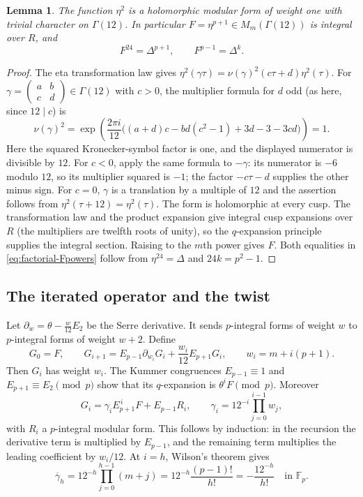 \documentclass[11pt,a4paper]{article}
\numberwithin{equation}{section}
\newtheorem{lemma}[theorem]{Lemma}
\theoremstyle{definition}
\theoremstyle{remark}
\newcommand{\Fp}{\mathbb F_p}
\begin{document}
\begin{lemma}\label{lem:eta-level12}
The function $\eta^2$ is a holomorphic modular form of weight one with
trivial character on $\Gamma(12)$. In particular
$F=\eta^{p+1}\in M_m(\Gamma(12))$ is integral over $R$, and
\begin{equation}\label{eq:factorial-Fpowers}
F^{24}=\Delta^{p+1},\qquad F^{p-1}=\Delta^k.
\end{equation}
\end{lemma}
\begin{proof}
The eta transformation law \citep[Ch.~4]{Knopp70} gives
$\eta^2(\gamma\tau)=\nu(\gamma)^2(c\tau+d)\eta^2(\tau)$.
For $\gamma=\begin{pmatrix}a&b\\c&d\end{pmatrix}\in\Gamma(12)$ with
$c>0$, the multiplier formula for $d$ odd (as here, since $12\mid c$) is
\[
\nu(\gamma)^2=
\exp\!\left(\frac{2\pi i}{12}
\bigl((a+d)c-bd(c^2-1)+3d-3-3cd\bigr)\right)=1.
\]
Here the squared Kronecker-symbol factor is one, and the displayed
numerator is divisible by $12$. For $c<0$, apply the same formula to
$-\gamma$: its numerator is $-6$ modulo $12$, so its multiplier squared
is $-1$; the factor $-c\tau-d$ supplies the other minus sign.
For $c=0$, $\gamma$ is a translation by a multiple of $12$ and the
assertion follows from $\eta^2(\tau+12)=\eta^2(\tau)$.
The form is holomorphic at every cusp. The transformation law and the
product expansion give integral cusp expansions over $R$ (the multipliers
are twelfth roots of unity), so the $q$-expansion principle supplies the
integral section. Raising to the $m$th power gives $F$.
Both equalities in \eqref{eq:factorial-Fpowers} follow from
$\eta^{24}=\Delta$ and $24k=p^2-1$.
\end{proof}

\subsection{The iterated operator and the twist}
Let $\partial_w=\theta-\frac{w}{12}E_2$ be the Serre derivative.
It sends $p$-integral forms of weight $w$ to $p$-integral forms of
weight $w+2$. Define
\[
G_0=F,\qquad
G_{i+1}=E_{p-1}\partial_{w_i}G_i+\frac{w_i}{12}E_{p+1}G_i,
\qquad w_i=m+i(p+1).
\]
Then $G_i$ has weight $w_i$. The Kummer congruences
$E_{p-1}\equiv1$ and $E_{p+1}\equiv E_2\pmod p$ show that its
$q$-expansion is $\theta^iF\pmod p$. Moreover
\begin{equation}\label{eq:factorial-leading}
G_i=\gamma_i E_{p+1}^{\,i}F+E_{p-1}R_i,\qquad
\gamma_i=12^{-i}\prod_{j=0}^{i-1}w_j,
\end{equation}
with $R_i$ a $p$-integral modular form. This follows by induction: in the
recursion the derivative term is multiplied by $E_{p-1}$, and the
remaining term multiplies the leading coefficient by $w_i/12$.
At $i=h$, Wilson's theorem gives
\begin{equation}\label{eq:factorial-gamma}
\overline\gamma_h
=12^{-h}\prod_{j=0}^{h-1}(m+j)
=12^{-h}\frac{(p-1)!}{h!}
=-\frac{12^{-h}}{h!}\quad\text{in }\Fp.
\end{equation}
\end{document}

